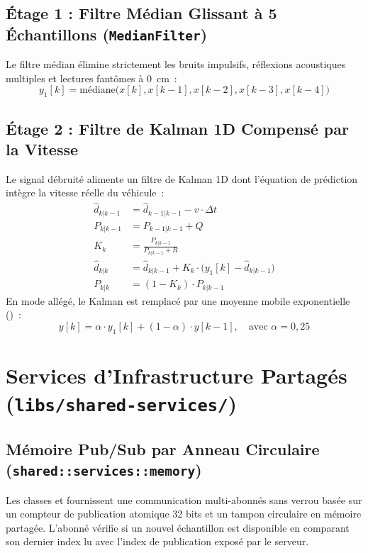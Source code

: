 \subsection{Étage 1 : Filtre Médian Glissant à 5 Échantillons (\texttt{MedianFilter})}
Le filtre médian élimine strictement les bruits impulsifs, réflexions acoustiques multiples et lectures fantômes à 0~cm~:
\begin{equation}
    y_1[k] = \text{médiane}\Big(x[k], x[k-1], x[k-2], x[k-3], x[k-4]\Big)
\end{equation}

\subsection{Étage 2 : Filtre de Kalman 1D Compensé par la Vitesse}
Le signal débruité alimente un filtre de Kalman 1D dont l'équation de prédiction intègre la vitesse réelle du véhicule~:
\begin{align}
    \hat{d}_{k|k-1} &= \hat{d}_{k-1|k-1} - v \cdot \Delta t \\
    P_{k|k-1} &= P_{k-1|k-1} + Q \\
    K_k &= \frac{P_{k|k-1}}{P_{k|k-1} + R} \\
    \hat{d}_{k|k} &= \hat{d}_{k|k-1} + K_k \cdot \Big(y_1[k] - \hat{d}_{k|k-1}\Big) \\
    P_{k|k} &= (1 - K_k) \cdot P_{k|k-1}
\end{align}
En mode allégé, le Kalman est remplacé par une moyenne mobile exponentielle ()~:
\begin{equation}
    y[k] = \alpha \cdot y_1[k] + (1 - \alpha) \cdot y[k-1], \quad \text{avec } \alpha = 0{,}25
\end{equation}

\section{Services d'Infrastructure Partagés (\texttt{libs/shared-services/})}

\subsection{Mémoire Pub/Sub par Anneau Circulaire (\texttt{shared::services::memory})}
Les classes  et  fournissent une communication multi-abonnés sans verrou basée sur un compteur de publication atomique 32 bits et un tampon circulaire en mémoire partagée. L'abonné vérifie si un nouvel échantillon est disponible en comparant son dernier index lu avec l'index de publication exposé par le serveur.

